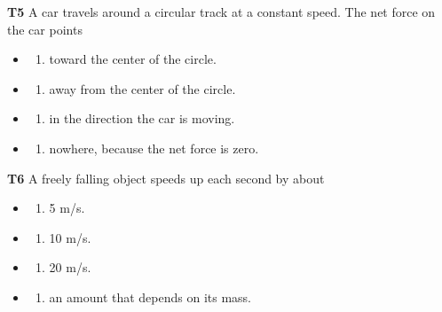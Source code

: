 \documentclass[
]{article}
\providecommand{\tightlist}{%
  \setlength{\itemsep}{0pt}\setlength{\parskip}{0pt}}
\begin{document}
\textbf{T5} A car travels around a circular track at a constant speed.
The net force on the car points

\begin{itemize}
\tightlist
\item
  \begin{enumerate}
  \def\labelenumi{\Alph{enumi})}
  \tightlist
  \item
    toward the center of the circle.
  \end{enumerate}
\item
  \begin{enumerate}
  \def\labelenumi{\Alph{enumi})}
  \setcounter{enumi}{1}
  \tightlist
  \item
    away from the center of the circle.
  \end{enumerate}
\item
  \begin{enumerate}
  \def\labelenumi{\Alph{enumi})}
  \setcounter{enumi}{2}
  \tightlist
  \item
    in the direction the car is moving.
  \end{enumerate}
\item
  \begin{enumerate}
  \def\labelenumi{\Alph{enumi})}
  \setcounter{enumi}{3}
  \tightlist
  \item
    nowhere, because the net force is zero.
  \end{enumerate}
\end{itemize}

\textbf{T6} A freely falling object speeds up each second by about

\begin{itemize}
\tightlist
\item
  \begin{enumerate}
  \def\labelenumi{\Alph{enumi})}
  \tightlist
  \item
    5 m/s.
  \end{enumerate}
\item
  \begin{enumerate}
  \def\labelenumi{\Alph{enumi})}
  \setcounter{enumi}{1}
  \tightlist
  \item
    10 m/s.
  \end{enumerate}
\item
  \begin{enumerate}
  \def\labelenumi{\Alph{enumi})}
  \setcounter{enumi}{2}
  \tightlist
  \item
    20 m/s.
  \end{enumerate}
\item
  \begin{enumerate}
  \def\labelenumi{\Alph{enumi})}
  \setcounter{enumi}{3}
  \tightlist
  \item
    an amount that depends on its mass.
  \end{enumerate}
\end{itemize}
\end{document}

